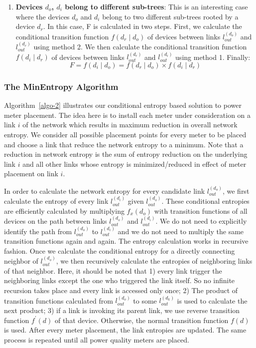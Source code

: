 \begin{enumerate}
\item \textbf{Devices $d_o$, $d_i$ belong to different sub-trees}:
This is an interesting case where the devices $d_o$ and $d_i$ belong to two different sub-trees rooted by a device $d_r$. In this case, F is calculated in two steps. First, we calculate the conditional transition function $f(d_r \mid d_o)$ of devices between links $l_{out}^{(d_o)}$ and $l_{out}^{(d_r)}$ using method 2. We then calculate the conditional transition function $f(d_i \mid d_r)$ of devices between links $l_{out}^{(d_r)}$ and $l_{out}^{(d_i)}$ using method 1. Finally: 
\[F = f(d_i \mid d_o) = f(d_r \mid d_o) \times f(d_i \mid d_r)\]
\end{enumerate}

\subsubsection{The MinEntropy Algorithm}
Algorithm~\ref{algo-2} illustrates our conditional entropy based solution to power meter placement. The idea here is to install each meter under consideration on a link $i$ of the network which results in maximum reduction in overall network entropy. We consider all possible placement points for every meter to be placed and choose a link that reduce the network entropy to a minimum. Note that a reduction in network entropy is the sum of entropy reduction on the underlying link $i$ and all other links whose entropy is minimized/reduced in effect of meter placement on link $i$.

In order to calculate the network entropy for every candidate link $l_{out}^{(d_o)}$, we first calculate the entropy of every link $l_{out}^{(d_i)}$ given $l_{out}^{(d_o)}$. These conditional entropies are efficiently calculated by multiplying $f_x(d_o)$ with transition functions of all devices on the path between links $l_{out}^{(d_o)}$ and $l_{out}^{(d_i)}$. We do not need to explicitly identify the path from $l_{out}^{(d_o)}$ to $l_{out}^{(d_i)}$ and we do not need to multiply the same transition functions again and again. The entropy calculation works in recursive fashion. Once we calculate the conditional entropy for a directly connecting neighbor of $l_{out}^{(d_o)}$, we then recursively calculate the entropies of neighboring links of that neighbor. Here, it should be noted that 1) every link trigger the neighboring links except the one who triggered the link itself. So no infinite recursion takes place and every link is accessed only once; 2) The product of transition functions calculated from $l_{out}^{(d_o)}$ to some $l_{out}^{(d_k)}$ is used to calculate the next product; 3) if a link is invoking its parent link, we use reverse transition function $f^\prime(d)$ of that device. Otherwise, the normal transition function $f(d)$ is used. After every meter placement, the link entropies are updated. The same process is repeated until all power quality meters are placed.


